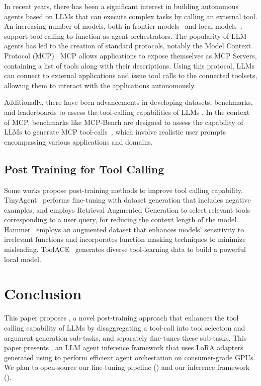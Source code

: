 In recent years, there has been a significant interest in building autonomous agents based on LLMs that can execute complex tasks by calling an external tool. An increasing number of models, both in frontier models~\cite{openai2025introducingGPT5, anthropic2025introducingClaude4} and local models~\cite{zhang2024xlam,lin2024hammer,liu2024toolace}, support tool calling to function as agent orchestrators. The popularity of LLM agents has led to the creation of standard protocols, notably the Model Context Protocol (MCP)~\cite{anthropic_mcp_2024}
MCP allows applications to expose themselves as MCP Servers, containing a list of tools along with their descriptions. Using this protocol, LLMs can connect to external applications and issue tool calls to the connected toolsets, allowing them to interact with the applications autonomously.  

Additionally, there have been advancements in developing datasets, benchmarks, and leaderboards to assess the tool-calling capabilities of LLMs \cite{patil2025bfcl}. In the context of MCP, benchmarks like MCP-Bench are designed to assess the capability of LLMs to generate MCP tool-calls~\cite{wang2025mcp}, which involve realistic user prompts encompassing various applications and domains.

\subsection{Post Training for Tool Calling}

Some works propose post-training methods to improve tool calling capability. TinyAgent~\cite{erdogan2024tinyagent} performs fine-tuning with dataset generation that includes negative examples, and employs Retrieval Augmented Generation to select relevant tools corresponding to a user query, for reducing the context length of the model. Hammer~\cite{lin2024hammer} employs an augmented dataset that enhances models’ sensitivity to irrelevant functions and incorporates function masking techniques to minimize misleading. ToolACE~\cite{liu2024toolace} generates diverse tool-learning data to build a powerful local model. 

\section{Conclusion}
\label{sec:conclusion}
This paper proposes \emph{\decoupled{}}, a novel post-training approach that  enhances the tool calling capability of LLMs by disaggregating a tool-call into tool selection and argument generation sub-tasks, and separately fine-tunes these sub-tasks. This paper presents \sys{}, an LLM agent inference framework that uses LoRA adapters generated using \decoupled{} to perform efficient agent orchestation on consumer-grade GPUs. We plan to open-source our fine-tuning pipeline (\decoupled{}) and our inference framework (\sys{}). 


